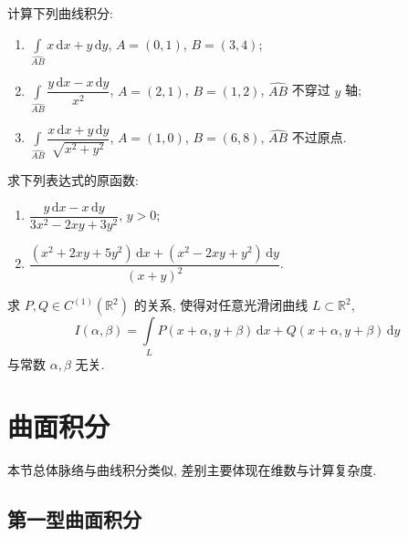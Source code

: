 \documentclass[../数学分析培优讲义.tex]{subfiles}
\begin{document}
\begin{example}
计算下列曲线积分:
\begin{enumerate}[label=(\arabic*)]
    \item $\displaystyle\int\limits_{\widehat{AB}}x\,\mathrm{d}x+y\,\mathrm{d}y$, $A=(0,1)$, $B=(3,4)$;
    \item $\displaystyle\int\limits_{\widehat{AB}}\dfrac{y\,\mathrm{d}x-x\,\mathrm{d}y}{x^2}$, $A=(2,1)$, $B=(1,2)$, $\widehat{AB}$ 不穿过 $y$ 轴;
    \item $\displaystyle\int\limits_{\widehat{AB}}\dfrac{x\,\mathrm{d}x+y\,\mathrm{d}y}{\sqrt{x^2+y^2}}$, $A=(1,0)$, $B=(6,8)$, $\widehat{AB}$ 不过原点.
\end{enumerate}
\end{example}
\exampleblank

\begin{example}
求下列表达式的原函数:
\begin{enumerate}[label=(\arabic*)]
    \item $\displaystyle\dfrac{y\,\mathrm{d}x-x\,\mathrm{d}y}{3x^2-2xy+3y^2}$, $y>0$;
    \item $\displaystyle\dfrac{(x^2+2xy+5y^2)\,\mathrm{d}x+(x^2-2xy+y^2)\,\mathrm{d}y}{(x+y)^2}$.
\end{enumerate}
\end{example}
\exampleblank

\begin{example}
求 $P,Q\in C^{(1)}(\mathbb{R}^2)$ 的关系, 使得对任意光滑闭曲线 $L\subset\mathbb{R}^2$,
\[
    I(\alpha,\beta)=\int\limits_LP(x+\alpha,y+\beta)\,\mathrm{d}x+Q(x+\alpha,y+\beta)\,\mathrm{d}y
\]
与常数 $\alpha,\beta$ 无关.
\end{example}
\exampleblank


\newpage

\section{曲面积分}

本节总体脉络与曲线积分类似, 差别主要体现在维数与计算复杂度.


\newpage

\subsection{第一型曲面积分}
\end{document}
